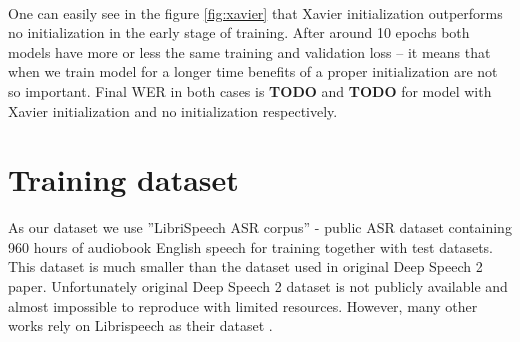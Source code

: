 \documentclass[licencjacka,en]{pracamgr}
\begin{document}
\noindent%
\begin{minipage}{\linewidth}%
		\label{fig:xavier}		     
\end{minipage}\\


One can easily see in the figure \ref{fig:xavier} that Xavier initialization outperforms no initialization in the early stage of training. After around 10 epochs both models have more or less the same training and validation loss -- it means that when we train model for a longer time benefits of a proper initialization are not so important. Final WER in both cases is \textbf{TODO} and \textbf{TODO} for model with Xavier initialization and no initialization respectively. 

\section{Training dataset}
As our dataset we use ''LibriSpeech ASR corpus'' \cite{DATA} - public ASR dataset containing 960 hours of audiobook English speech for training together with test datasets. This dataset is much smaller than the dataset used in original Deep Speech 2 paper. Unfortunately original Deep Speech 2 dataset is not publicly available and almost impossible to reproduce with limited resources. However, many other works rely on Librispeech as their dataset \cite{LIBRI-EX}.
\end{document}
